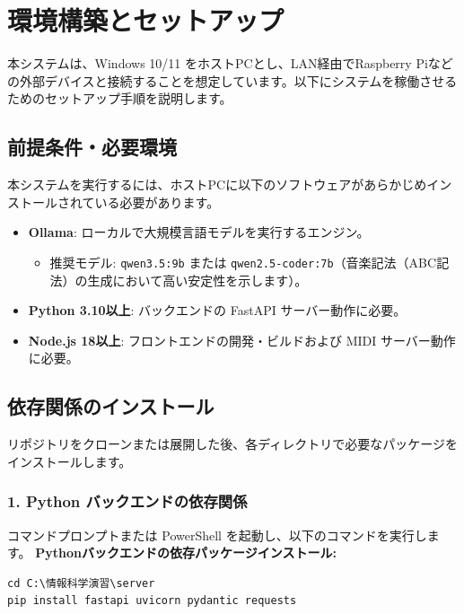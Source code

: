 \section{環境構築とセットアップ}

本システムは、Windows 10/11 をホストPCとし、LAN経由でRaspberry Piなどの外部デバイスと接続することを想定しています。以下にシステムを稼働させるためのセットアップ手順を説明します。

\subsection{前提条件・必要環境}

本システムを実行するには、ホストPCに以下のソフトウェアがあらかじめインストールされている必要があります。

\begin{itemize}
  \item \textbf{Ollama}: ローカルで大規模言語モデルを実行するエンジン。
    \begin{itemize}
      \item 推奨モデル: \texttt{qwen3.5:9b} または \texttt{qwen2.5-coder:7b}（音楽記法（ABC記法）の生成において高い安定性を示します）。
    \end{itemize}
  \item \textbf{Python 3.10以上}: バックエンドの FastAPI サーバー動作に必要。
  \item \textbf{Node.js 18以上}: フロントエンドの開発・ビルドおよび MIDI サーバー動作に必要。
\end{itemize}

\subsection{依存関係のインストール}

リポジトリをクローンまたは展開した後、各ディレクトリで必要なパッケージをインストールします。

\subsubsection{1. Python バックエンドの依存関係}
コマンドプロンプトまたは PowerShell を起動し、以下のコマンドを実行します。
\textbf{Pythonバックエンドの依存パッケージインストール:}\\
\begin{lstlisting}[style=powershell]
cd C:\情報科学演習\server
pip install fastapi uvicorn pydantic requests
\end{lstlisting}


